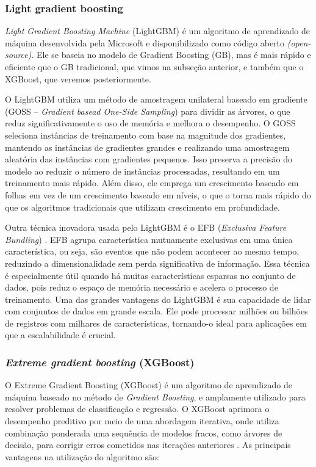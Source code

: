 \subsubsection{Light gradient boosting}
\textit{Light Gradient Boosting Machine} (LightGBM) é um algoritmo de aprendizado de
máquina desenvolvida pela Microsoft e disponibilizado como código aberto \textit{(open-source)}. Ele
se baseia no modelo de Gradient Boosting (GB), mas é mais rápido e eficiente que o GB
tradicional, que vimos na subseção anterior, e também que o XGBoost, que veremos
posteriormente.

O LightGBM utiliza um método de amostragem unilateral baseado em gradiente (GOSS
– \textit{Gradient basead One-Side Sampling}) para dividir as árvores, o que reduz significativamente
o uso de memória e melhora o desempenho. O GOSS seleciona instâncias de treinamento com
base na magnitude dos gradientes, mantendo as instâncias de gradientes grandes e realizando
uma amostragem aleatória das instâncias com gradientes pequenos. Isso preserva a precisão do
modelo ao reduzir o número de instâncias processadas, resultando em um treinamento mais
rápido. Além disso, ele emprega um crescimento baseado em folhas em vez de um crescimento
baseado em níveis, o que o torna mais rápido do que os algoritmos tradicionais que utilizam
crescimento em profundidade. 

Outra técnica inovadora usada pelo LightGBM é o EFB
(\textit{Exclusiva Feature Bundling}) \cite{ke2017lightgbm}. EFB agrupa característica mutuamente exclusivas em uma
única característica, ou seja, são eventos que não podem acontecer ao mesmo tempo, reduzindo
a dimensionalidade sem perda significativa de informação. Essa técnica é especialmente útil
quando há muitas características esparsas no conjunto de dados, pois reduz o espaço de memória necessário e acelera o processo de treinamento. Uma das grandes vantagens do
LightGBM é sua capacidade de lidar com conjuntos de dados em grande escala. Ele pode
processar milhões ou bilhões de registros com milhares de características, tornando-o ideal para
aplicações em que a escalabilidade é crucial.

\subsubsection{\textit{Extreme gradient boosting} (XGBoost)}
O \textit{}{Extreme Gradient Boosting} (XGBoost) é um algoritmo de aprendizado de
máquina baseado no método de \textit{Gradient Boosting}, e amplamente utilizado para resolver
problemas de classificação e regressão. O XGBoost aprimora o desempenho preditivo por meio
de uma abordagem iterativa, onde utiliza combinação ponderada uma sequência de modelos
fracos, como árvores de decisão, para corrigir erros cometidos nas iterações anteriores \cite{chen2016xgboost}. As
principais vantagens na utilização do algoritmo são:

